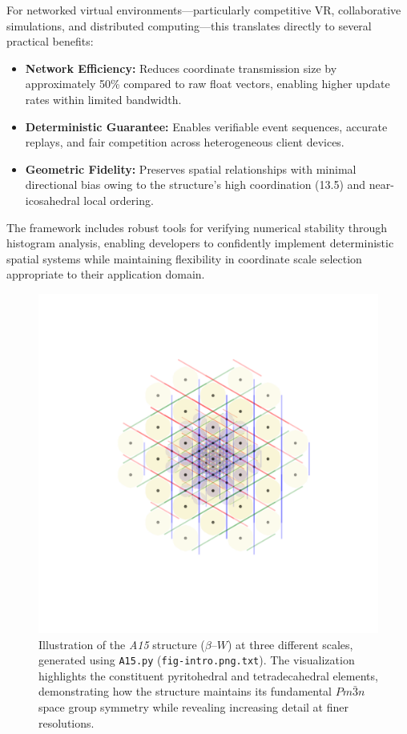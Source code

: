 \documentclass[10pt]{article}
\def\AAAB{\textit{A15}}
\def\betaW{$\beta$--$W$}
\begin{document}
For networked virtual environments—particularly competitive VR, collaborative simulations, and distributed computing—this translates directly to several practical benefits:
\begin{itemize}
    \item \textbf{Network Efficiency:} Reduces coordinate transmission size by approximately 50\% compared to raw float vectors, enabling higher update rates within limited bandwidth.
    \item \textbf{Deterministic Guarantee:} Enables verifiable event sequences, accurate replays, and fair competition across heterogeneous client devices.
    \item \textbf{Geometric Fidelity:} Preserves spatial relationships with minimal directional bias owing to the structure's high coordination (13.5) and near-icosahedral local ordering.
\end{itemize}

The framework includes robust tools for verifying numerical stability through histogram analysis, enabling developers to confidently implement deterministic spatial systems while maintaining flexibility in coordinate scale selection appropriate to their application domain.

\begin{figure}[!ht]
    \capstart
    \centering
    \includegraphics[trim={150 150 150 155}, scale=0.75]{fig-intro}
    \caption{Illustration of the \AAAB{} structure (\betaW{}) at three different scales, generated using \texttt{A15.py} (\texttt{fig-intro.png.txt}). The visualization highlights the constituent pyritohedral and tetradecahedral elements, demonstrating how the structure maintains its fundamental $Pm\bar{3}n$ space group symmetry while revealing increasing detail at finer resolutions.}
    \label{fig-intro}
\end{figure}
\end{document}
